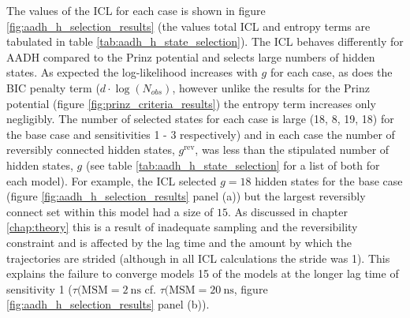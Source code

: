 The values of the ICL for each case is shown in figure \ref{fig:aadh_h_selection_results} (the values total ICL and entropy terms are tabulated in table \ref{tab:aadh_h_state_selection}). The ICL behaves differently for AADH compared to the Prinz potential and selects large numbers of hidden states. As expected the log-likelihood increases with $g$ for each case, as does the BIC penalty term ($d\cdot\log{\left(N_{obs}\right)}$, however unlike the results for the Prinz potential (figure \ref{fig:prinz_criteria_results}) the entropy term increases only negligibly. The number of selected states for each case is large (18, 8, 19, 18) for the base case and sensitivities 1 - 3 respectively) and in each case the number of reversibly connected hidden states, $g^{\mathrm{rev}}$, was less than the stipulated number of hidden states, $g$ (see table \ref{tab:aadh_h_state_selection} for a list of both for each model). For example, the ICL selected $g=18$ hidden states for the base case (figure \ref{fig:aadh_h_selection_results} panel (a)) but the largest reversibly connect set within this model had a size of $15$. As discussed in chapter \ref{chap:theory} this is a result of inadequate sampling and the reversibility constraint and is affected by the lag time and the amount by which the trajectories are strided (although in all ICL calculations the stride was 1). This  explains the failure to converge models 15 of the models at the longer lag time of sensitivity 1 ($\tau(\mathrm{MSM}=\SI{2}{\nano\second}$ cf. $\tau(\mathrm{MSM}=\SI{20}{\nano\second}$, figure \ref{fig:aadh_h_selection_results} panel (b)).  

